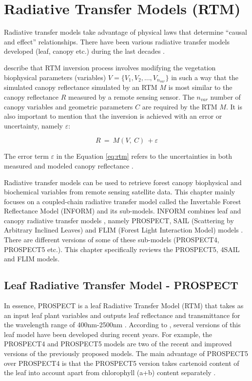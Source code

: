 \documentclass[a4paper, twoside]{templates/ociamthesis}
\begin{document}
\hypertarget{rtm}{%
\section{Radiative Transfer Models (RTM)}\label{rtm}}

Radiative transfer models take advantage of physical laws that determine ``causal and effect'' relationships. There have been various radiative transfer models developed (leaf, canopy etc.) during the last decades \citep{verrelst2019quantifying}.

\citet{combal2003retrieval} describe that RTM inversion process involves modifying the vegetation biophysical parameters (variables) \(V = \{V_{1}, V_{2}, ..., V_{n_{var}}\}\) in such a way that the simulated canopy reflectance simulated by an RTM \(M\) is most similar to the canopy reflectance \(R\) measured by a remote sensing sensor. The \(n_{var}\) number of canopy variables and geometric parameters \(C\) are required by the RTM \(M\). It is also important to mention that the inversion is achieved with an error or uncertainty, namely \(\varepsilon\):

\begin{equation}
R\ =\ M\left(V,\ C\right)\ +\varepsilon
\label{eq:rtm}
\end{equation}

The error term \(\varepsilon\) in the Equation \eqref{eq:rtm} refers to the uncertainties in both measured and modeled canopy reflectance \citep{combal2003retrieval}.

Radiative transfer models can be used to retrieve forest canopy biophysical and biochemical variables from remote sensing satellite data. This chapter mainly focuses on a coupled-chain radiative transfer model called the Invertable Forest Reflectance Model (INFORM) and its sub-models. INFORM combines leaf and canopy radiative transfer models \citep{atzberger2000development}, namely PROSPECT, SAIL (Scattering by Arbitrary Inclined Leaves) and FLIM (Forest Light Interaction Model) models \citep{schlerf2006inversion}. There are different versions of some of these sub-models (PROSPECT4, PROSPECT5 etc.). This chapter specifically reviews the PROSPECT5, 4SAIL and FLIM models.

\hypertarget{prospect}{%
\subsection{Leaf Radiative Transfer Model - PROSPECT}\label{prospect}}

In essence, PROSPECT is a leaf Radiative Transfer Model (RTM) that takes as an input leaf plant variables and outputs leaf reflectance and transmittance for the wavelength range of 400nm-2500nm \citep{jacquemoud1990prospect}. According to \citet{yang2021improving}, several versions of this leaf model have been developed during recent years. For example, the PROSPECT4 and PROSPECT5 models are two of the recent and improved versions of the previously proposed models. The main advantage of PROSPECT5 over PROSPECT4 is that the PROSPECT5 version takes cartenoid content of the leaf into account apart from chlorophyll (a+b) content separately \citep{yang2021improving}.
\end{document}
